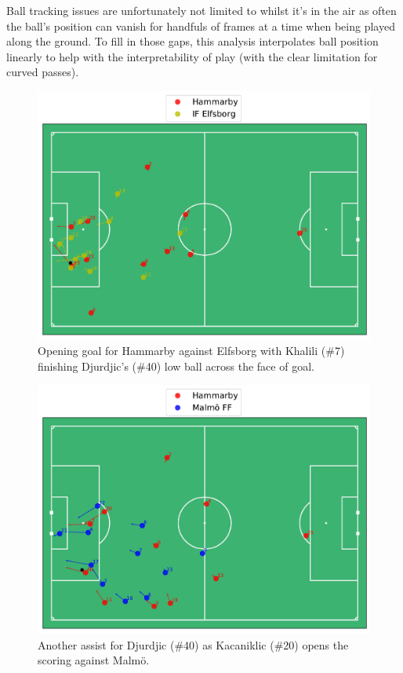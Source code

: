 \documentclass[twocolumn,prl,nobalancelastpage,aps,10pt]{revtex4-1}
\begin{document}
Ball tracking issues are unfortunately not limited to whilst it's in the air as often the ball's position can vanish for handfuls of frames at a time when being played along the ground. To fill in those gaps, this analysis interpolates ball position linearly to help with the interpretability of play (with the clear limitation for curved passes).

\begin{figure}
\includegraphics*[width=0.75\linewidth,clip]{Elfsborg_Goal_1}
\caption{Opening goal for Hammarby against Elfsborg with Khalili (\#7) finishing Djurdjic's (\#40) low ball across the face of goal.}
\label{elf}
\end{figure}

\begin{figure}
\includegraphics*[width=0.75\linewidth,clip]{Malmo_Goal_1}
\caption{Another assist for Djurdjic (\#40) as Kacaniklic (\#20) opens the scoring against Malm{\"o}.}
\label{malmo}
\end{figure}
\end{document}
